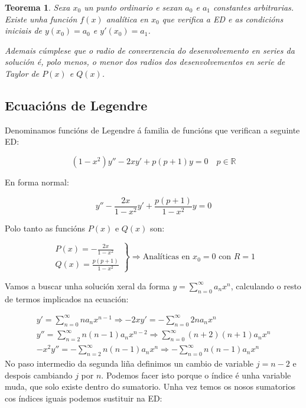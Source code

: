 \documentclass[a4paper,12pt,titlepage]{article}
\newtheorem{theorem}{Teorema}
\begin{document}
\begin{theorem}
    Sexa $x_0$ un punto ordinario e sexan $a_0$ e $a_1$ constantes arbitrarias. Existe unha función $f(x)$ analítica en $x_0$ que verifica a ED e as condicións iniciais de $y(x_0)=a_0$ e $y'(x_0)=a_1$.
    \par Ademais cúmplese que o radio de converxencia do desenvolvemento en series da solución é, polo menos, o menor dos radios dos desenvolvementos en serie de Taylor de $P(x)$ e $Q(x)$.
\end{theorem}

\subsection{Ecuacións de Legendre}

Denominamos funcións de Legendre á familia de funcións que verifican a seguinte ED:

\begin{equation*}
    (1-x^2)y''-2xy'+p(p+1)y=0 \quad p \in \mathbb{R}
\end{equation*}

En forma normal:

\begin{equation*}
    y'' - \frac{2x}{1-x^2}y'+ \frac{p(p+1)}{1-x^2}y=0
\end{equation*}

Polo tanto as funcións $P(x)$ e $Q(x)$ son:

\begin{equation*}
    \left.
    \begin{array}{c}
        P(x)= - \frac{2x}{1-x^2} \\
        Q(x) = \frac{p(p+1)}{1-x^2}  
    \end{array}
    \right\}\Rightarrow \text{Analíticas en $x_0=0$ con $R=1$} 
\end{equation*}

Vamos a buscar unha solución xeral da forma $y=\sum_{n=0}^{\infty} a_nx^n$, calculando o resto de termos implicados na ecuación:

\begin{equation*}
    \begin{gathered}
        y' = \sum_{n=0}^{\infty} na_nx^{n-1} \Rightarrow -2xy' = -\sum_{n=0}^{\infty} 2na_nx^n\\
        y'' = \sum_{n=2}^{\infty} n(n-1)a_nx^{n-2} \Rightarrow \sum_{n=0}^{\infty} (n+2)(n+1)a_nx^{n} \\
        -x^2y'' = - \sum _{n=2}^{\infty} n(n-1)a_n x^n \Rightarrow - \sum _{n=0}^{\infty} n(n-1)a_n x^n
    \end{gathered}
\end{equation*}
No paso intermedio da segunda liña definimos un cambio de variable $j = n-2$ e despois cambiando $j$ por $n$. Podemos facer isto porque o índice é unha variable muda, que solo existe dentro do sumatorio. Unha vez temos os nosos sumatorios cos índices iguais podemos sustituir na ED:
\end{document}
